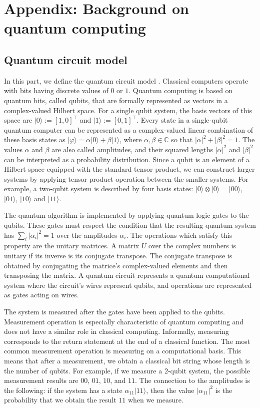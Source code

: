 \section{Appendix: Background on quantum computing}

\subsection{Quantum circuit model}

In this part, we define the quantum circuit model \cite{Nielsen_Chuang_2010}. Classical computers operate with bits having discrete values of $0$ or $1$. Quantum computing is based on quantum bits, called qubits, that are formally represented as vectors in a complex-valued Hilbert space. For a single qubit system, the basis vectors of this space are $|0\rangle:= [1, 0]^{\top}$ and $|1\rangle:= [0, 1]^{\top}$. Every state in a single-qubit quantum computer can be represented as a complex-valued linear combination of these basis states as $|\varphi\rangle = \alpha |0\rangle + \beta |1\rangle$, where $\alpha, \beta \in \mathds{C}$ so that $|\alpha|^2 + |\beta|^2 = 1$. The values $\alpha$ and $\beta$ are also called amplitudes, and their squared lengths $|\alpha|^2 $ and $|\beta|^2$ can be interpreted as a probability distribution. Since a qubit is an element of a Hilbert space equipped with the standard tensor product, we can construct larger systems by applying tensor product operation between the smaller systems. For example, a two-qubit system is described by four basis states: $|0\rangle\otimes|0\rangle = |00\rangle$, $|01\rangle$, $|10 \rangle$ and $|11\rangle$.

The quantum algorithm is implemented by applying quantum logic gates to the qubits. These gates must respect the condition that the resulting quantum system has $\sum_{i}|\alpha_i|^2 = 1$ over the amplitudes $\alpha_i$. The operations which satisfy this property are the unitary matrices. A matrix $U$ over the complex numbers is unitary if its inverse is its conjugate transpose. The conjugate transpose is obtained by conjugating the matrice's complex-valued elements and then transposing the matrix. A quantum circuit represents a quantum computational system where the circuit's wires represent qubits, and operations are represented as gates acting on wires. 

The system is measured after the gates have been applied to the qubits. Measurement operation is especially characteristic of quantum computing and does not have a similar role in classical computing. Informally, measuring corresponds to the return statement at the end of a classical function. The most common measurement operation is measuring on a computational basis. This means that after a measurement, we obtain a classical bit string whose length is the number of qubits. For example, if we measure a 2-qubit system, the possible measurement results are $00$, $01$, $10$, and $11$. The connection to the amplitudes is the following: if the system has a state $\alpha_{11}|11\rangle$, then the value $|\alpha_{11}|^2$ is the probability that we obtain the result $11$ when we measure. 

